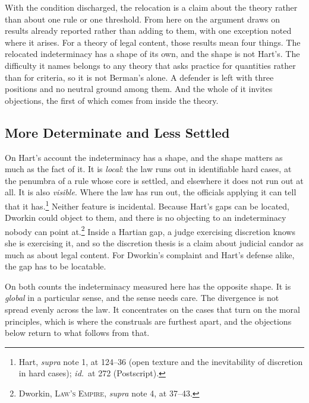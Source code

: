 With the condition discharged, the relocation is a claim about the theory
rather than about one rule or one threshold. From here on the argument draws on results already reported rather than
adding to them, with one exception noted where it arises. For a theory of
legal content, those results mean four things. The relocated indeterminacy has a shape of its own, and the
shape is not Hart's. The difficulty it names belongs to any theory that
asks practice for quantities rather than for criteria, so it is not
Berman's alone. A defender is left with three positions and no neutral
ground among them. And the whole of it invites objections, the first of
which comes from inside the theory.

\subsection{More Determinate and Less Settled}

On Hart's account the indeterminacy has a shape, and the shape matters as
much as the fact of it. It is \textit{local}: the law runs out in identifiable hard
cases, at the penumbra of a rule whose core is settled, and elsewhere it
does not run out at all. It is also \textit{visible}. Where the law has
run out, the officials applying it can tell that it has.\footnote{Hart,
\textit{supra} note 1, at 124--36 (open texture and the inevitability of
discretion in hard cases); \textit{id.}\ at 272 (Postscript).} Neither
feature is incidental. Because Hart's gaps can be located, Dworkin could object to them, and there
is no objecting to an indeterminacy nobody can point at.\footnote{Dworkin, \textsc{Law's Empire}, \textit{supra}
note 4, at 37--43.} Inside a Hartian gap, a judge exercising discretion knows she is exercising
it, and so the discretion thesis is a claim about judicial candor as much as
about legal content. For Dworkin's complaint and Hart's defense alike, the gap has to be
locatable.

On both counts the indeterminacy measured here has the opposite shape. It
is \textit{global} in a particular sense, and the sense needs care. The
divergence is not spread evenly across the law. It concentrates on the cases that turn on the moral principles, which is
where the construals are furthest apart, and the objections below return to what follows from that.

